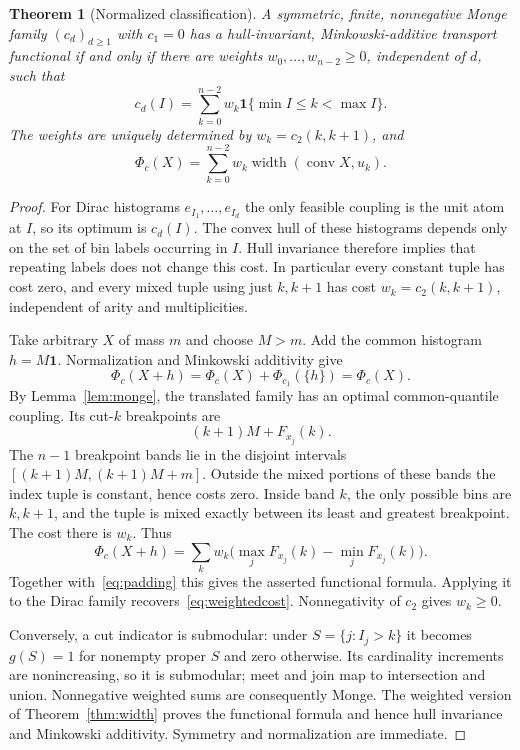 \documentclass[11pt]{article}
\newtheorem{theorem}{Theorem}[section]
\theoremstyle{definition}\newtheorem{definition}[theorem]{Definition}
\newcommand{\1}{\mathbf 1}
\newcommand{\conv}{\operatorname{conv}}
\newcommand{\width}{\operatorname{width}}
\begin{document}
\begin{theorem}[Normalized classification]\label{thm:rigidity}
A symmetric, finite, nonnegative Monge family $(c_d)_{d\ge1}$ with $c_1=0$
has a hull-invariant, Minkowski-additive transport functional if and only if
there are weights $w_0,\ldots,w_{n-2}\ge0$, independent of $d$, such that
\begin{equation}\label{eq:weightedcost}
 c_d(I)=\sum_{k=0}^{n-2}w_k\1\{\min I\le k<\max I\}.
\end{equation}
The weights are uniquely determined by $w_k=c_2(k,k+1)$, and
\[
 \Phi_c(X)=\sum_{k=0}^{n-2}w_k\width(\conv X,u_k).
\]
\end{theorem}
\begin{proof}
For Dirac histograms $e_{I_1},\ldots,e_{I_d}$ the only feasible coupling is the
unit atom at $I$, so its optimum is $c_d(I)$. The convex hull of these histograms
depends only on the set of bin labels occurring in $I$. Hull invariance therefore
implies that repeating labels does not change this cost. In particular every
constant tuple has cost zero, and every mixed tuple using just $k,k+1$ has cost
$w_k=c_2(k,k+1)$, independent of arity and multiplicities.

Take arbitrary $X$ of mass $m$ and choose $M>m$. Add the common histogram
$h=M\1$. Normalization and Minkowski additivity give
\begin{equation}\label{eq:padding}
 \Phi_c(X+h)=\Phi_c(X)+\Phi_{c_1}(\{h\})=\Phi_c(X).
\end{equation}
By Lemma~\ref{lem:monge}, the translated family has an optimal common-quantile
coupling. Its cut-$k$ breakpoints are
\[
 (k+1)M+F_{x_j}(k).
\]
The $n-1$ breakpoint bands lie in the disjoint intervals
$[(k+1)M,(k+1)M+m]$. Outside the mixed portions of these bands the index tuple
is constant, hence costs zero. Inside band $k$, the only possible bins are
$k,k+1$, and the tuple is mixed exactly between its least and greatest
breakpoint. The cost there is $w_k$. Thus
\[
 \Phi_c(X+h)=\sum_k w_k\bigl(\max_jF_{x_j}(k)-\min_jF_{x_j}(k)\bigr).
\]
Together with~\eqref{eq:padding} this gives the asserted functional formula.
Applying it to the Dirac family recovers~\eqref{eq:weightedcost}. Nonnegativity
of $c_2$ gives $w_k\ge0$.

Conversely, a cut indicator is submodular: under $S=\{j:I_j>k\}$ it becomes
$g(S)=1$ for nonempty proper $S$ and zero otherwise. Its cardinality increments
are nonincreasing, so it is submodular; meet and join map to intersection and
union. Nonnegative weighted sums are consequently Monge. The weighted version
of Theorem~\ref{thm:width} proves the functional formula and hence hull
invariance and Minkowski additivity. Symmetry and normalization are immediate.
\end{proof}
\end{document}
